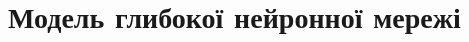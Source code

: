\documentclass[14pt,a4paper]{extarticle}
\newcounter{e}
\numberwithin{equation}{section}
\numberwithin{figure}{section}
\begin{document}

	
	\newpage
	\thispagestyle{empty}
	\section{Модель глибокої нейронної мережі}
\end{document}
